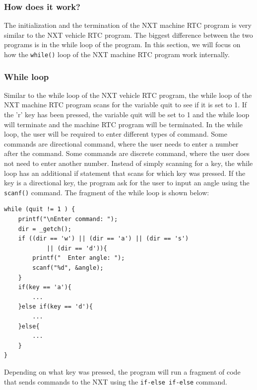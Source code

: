 \documentclass[11pt]{article}
\begin{document}
\subsubsection*{How does it work?}
The initialization and the termination of the NXT machine RTC program is very similar to the
NXT vehicle RTC program. The biggest difference between the two programs is in the while loop of the program.
In this section, we will focus on how the \texttt{while()} loop of the NXT machine RTC program work internally.

\subsubsection*{While loop}
Similar to the while loop of the NXT vehicle RTC program, the while loop of the NXT machine RTC program scans for the
variable quit to see if it is set to 1. If the 'r' key has been pressed, the variable quit will be set to 1 and the 
while loop will terminate and the machine RTC program will be terminated. In the while loop, the user will be required 
to enter different types of command. Some commands are directional command, where the user needs to enter a number 
after the command. Some commands are discrete command, where the user does not need to enter another number.
Instead of simply scanning for a key, the while loop has an additional if statement that scans for which key
was pressed. If the key is a directional key, the program ask for the user to input an angle using the \verb+scanf()+ 
command. The fragment of the while loop is shown below:

\begin{verbatim}
while (quit != 1 ) {
    printf("\nEnter command: ");
    dir = _getch();
    if ((dir == 'w') || (dir == 'a') || (dir == 's') 
            || (dir == 'd')){
        printf("  Enter angle: ");
        scanf("%d", &angle);
    }
    if(key == 'a'){
        ...
    }else if(key == 'd'){
        ...
    }else{
        ...
    }
}
\end{verbatim}

Depending on what key was pressed, the program will run a fragment of code that sends commands to the NXT using the
\verb+if-else if-else+ command.
\end{document}
